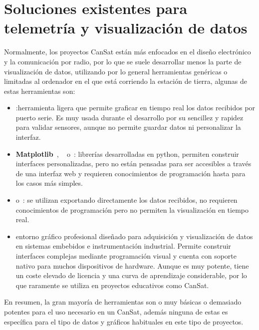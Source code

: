 \section{Soluciones existentes para telemetría y visualización de datos}
Normalmente, los proyectos CanSat están más enfocados en el diseño electrónico y la comunicación por radio,
por lo que se suele desarrollar menos la parte de visualización de datos, utilizando por lo general herramientas genéricas
o limitadas al ordenador en el que está corriendo la estación de tierra, algunas de estas herramientas son:

\begin{itemize}
    \item \textbf{\cite{serialplot}}:herramienta ligera que permite graficar en tiempo real los datos recibidos por puerto serie.
    Es muy usada durante el desarrollo por su sencillez y rapidez para validar sensores, aunque no permite guardar datos ni personalizar la interfaz.
    \item \textbf{Matplotlib}~\cite{matplotlib}, ~\textbf{\cite{pyqtgraph}} o~\textbf{\cite{tkinter}}: librerías desarrolladas en python, permiten construir interfaces personalizadas, pero no están pensadas para ser accesibles a través de una interfaz web y requieren conocimientos de programación hasta para los casos más simples.
    \item \textbf{\cite{excel}} o~\textbf{\cite{googlesheets}}: se utilizan exportando directamente los datos recibidos, no requieren conocimientos de programación pero no permiten la visualización en tiempo real.
    \item \textbf{\cite{labview}} entorno gráfico profesional diseñado para adquisición y visualización de datos en sistemas embebidos e instrumentación industrial.
    Permite construir interfaces complejas mediante programación visual y cuenta con soporte nativo para muchos dispositivos de hardware.
    Aunque es muy potente, tiene un coste elevado de licencia y una curva de aprendizaje considerable, por lo que raramente se utiliza en proyectos educativos como CanSat.
\end{itemize}

En resumen, la gran mayoría de herramientas son o muy básicas o demasiado potentes para el uso necesario en un CanSat, además ninguna de estas es específica para el tipo de datos y gráficos habituales en este tipo de proyectos.
